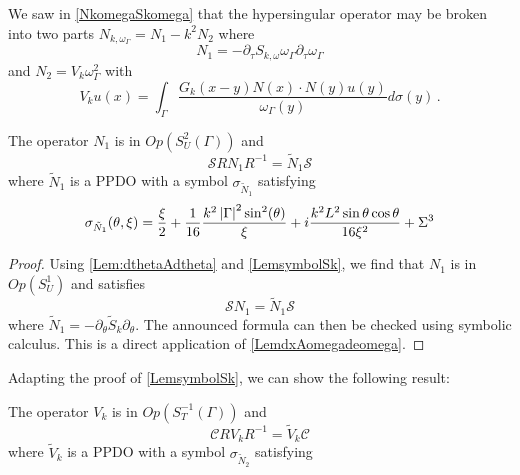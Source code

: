 \documentclass[a4paper]{article}
\begin{document}
We saw in \autoref{NkomegaSkomega} that the hypersingular operator may be broken into two parts $N_{k,\omega_\Gamma} = N_1 - k^2N_2$ where 
\[N_1 = -\partial_\tau S_{k,\omega} \omega_\Gamma \partial_\tau \omega_\Gamma\]
and $N_2 = V_k\omega_\Gamma^2$ with
\[V_ku(x) = \int_{\Gamma} \frac{G_k(x-y)N(x)\cdot N(y) u(y)}{\omega_\Gamma(y)}d\sigma(y)\,.\]
\begin{Lem}
	\label{LemsymbolN1}
	The operator $N_1$ is in $\textit{Op}(S_U^2(\Gamma))$ and  
	\[\mathcal{S}RN_1R^{-1} = \tilde{N}_1 \mathcal{S}\]
	where $\tilde{N}_1$ is a PPDO with a symbol $\sigma_{\tilde{N}_1}$ satisfying
	\begin{equation}
		\sigma_{\tilde{N}_1}(\theta,\xi) = \frac{\xi}{2} + \frac{1}{16}\frac{k^2 \left\lvert \Gamma \right\rvert^2 \sin^2(\theta)}{\xi} + i\frac{k^2 L^2 \sin\theta\cos\theta}{16\xi^2} + \Sigma^3
		\label{symboleN1}
	\end{equation}
\end{Lem}
\begin{proof}
	Using \autoref{Lem:dthetaAdtheta} and \autoref{LemsymbolSk}, we find that $N_1$ is in $\textit{Op}(S_U^1)$ and satisfies 
	\[\mathcal{S}N_1 = \tilde{N}_1 \mathcal{S}\]
	where $\tilde{N}_1 = -\partial_\theta \tilde{S}_{k} \partial_\theta$. The announced formula can then be checked using symbolic calculus. 
	This is a direct application of \autoref{LemdxAomegadeomega}.
\end{proof}
Adapting the proof of \autoref{LemsymbolSk}, we can show the following result:
\begin{Lem}
	\label{LemsymbolVk}
	The operator $V_k$ is in $\textit{Op}(S_T^{-1}(\Gamma))$ and 
	\[\mathcal{C}RV_kR^{-1} = \tilde{V}_k \mathcal{C}\]
	where $\tilde{V}_k$ is a PPDO with a symbol $\sigma_{\tilde{N}_2}$ satisfying

\end{Lem}
\end{document}
